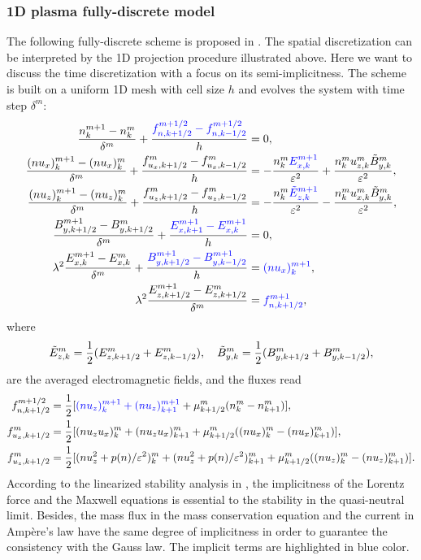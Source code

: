 \documentclass{article}
\begin{document}
\subsubsection{1D plasma fully-discrete model}
The following fully-discrete scheme is proposed in \cite{degond_2012}. The spatial discretization can be interpreted by the 1D projection procedure illustrated above. Here we want to discuss the time discretization with a focus on its semi-implicitness. The scheme is built on a uniform 1D mesh with cell size $h$ and evolves the system with time step $\delta^m$:  
\begin{align*}
    \frac{n^{m+1}_k - n^m_k}{\delta^m} + \frac{\textcolor{blue}{f^{m+1/2}_{n,k+1/2} - f^{m+1/2}_{n,k-1/2}}}{h} &= 0, \\
    \frac{(nu_x)^{m+1}_k - (nu_x)^m_k}{\delta^m} + \frac{f^{m}_{u_x,k+1/2} - f^{m}_{u_x,k-1/2}}{h} &= -\frac{n^m_k \textcolor{blue}{E^{m+1}_{x,k}}}{\varepsilon^2} + \frac{n^m_k u^m_{z,k}\Tilde{B}^m_{y,k}}{\varepsilon^2},\\
    \frac{(nu_z)^{m+1}_k - (nu_z)^m_k}{\delta^m} + \frac{f^{m}_{u_z,k+1/2} - f^{m}_{u_z,k-1/2}}{h} &= - \frac{n^m_k \textcolor{blue}{\Tilde{E}^{m+1}_{z,k}}}{\varepsilon^2} - \frac{n^m_k u^m_{x,k}\Tilde{B}^m_{y,k}}{\varepsilon^2}, \\ 
    \frac{B^{m+1}_{y,k+1/2} - B^{m}_{y,k+1/2}}{\delta^m} + \frac{\textcolor{blue}{E^{m+1}_{x,k+1} - E^{m+1}_{x,k}}}{h} &= 0, \\
    \lambda^2 \frac{E^{m+1}_{x,k} - E^{m}_{x,k}}{\delta^m} + \frac{\textcolor{blue}{B^{m+1}_{y,k+1/2} - B^{m+1}_{y,k-1/2}}}{h} &= \textcolor{blue}{(nu_x)^{m+1}_k}, \\
    \lambda^2 \frac{E^{m+1}_{z,k+1/2} - E^{m}_{z,k+1/2}}{\delta^m} &= \textcolor{blue}{f^{m+1}_{n,k+1/2}}, 
\end{align*}
where 
\begin{equation*}
    \Tilde{E}^m_{z,k} = \frac{1}{2}(E^m_{z,k+1/2} + E^m_{z,k-1/2}), \ \ \ \Tilde{B}^m_{y,k} = \frac{1}{2}(B^m_{y,k+1/2} + B^m_{y,k-1/2}),
\end{equation*}
are the averaged electromagnetic fields, and the fluxes read
\begin{align*}
    f^{m+1/2}_{n,k+1/2} & = \frac{1}{2}[\textcolor{blue}{(nu_z)^{m+1}_k + (nu_z)^{m+1}_{k+1}} + \mu^m_{k+1/2}(n^m_k - n^m_{k+1})], \\
    f^{m}_{u_x,k+1/2} & = \frac{1}{2}[(nu_zu_x)^{m}_k + (nu_zu_x)^{m}_{k+1} + \mu^m_{k+1/2}((nu_x)^m_k - (nu_x)^m_{k+1})], \\
    f^{m}_{u_z,k+1/2} & = \frac{1}{2}[(nu_z^2 + p(n)/\varepsilon^2)^{m}_k + (nu_z^2 + p(n)/\varepsilon^2)^{m}_{k+1} + \mu^m_{k+1/2}((nu_z)^m_k - (nu_z)^m_{k+1})]. \\
\end{align*}
According to the linearized stability analysis in \cite{degond_2012}, the implicitness of the Lorentz force and the Maxwell equations is essential to the stability in the quasi-neutral limit. Besides, the mass flux in the mass conservation equation and the current in Amp\`{e}re's law have the same degree of implicitness in order to guarantee the consistency with the Gauss law. The implicit terms are highlighted in blue color. 
\end{document}
